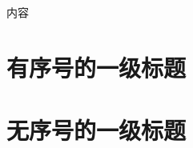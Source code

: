 \documentclass[UTF8]{article}
\author{cbs}
\date{} %
\begin{document}
  \maketittle
    内容
  \section{有序号的一级标题}
  \section*{无序号的一级标题}
\end{document}
